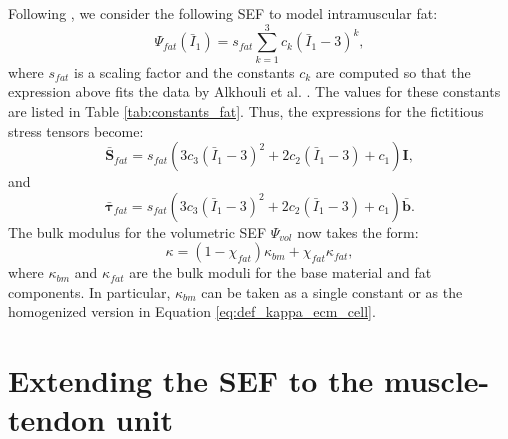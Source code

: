 \documentclass{sfuthesis}
\numberwithin{equation}{section}
\numberwithin{figure}{chapter}
\numberwithin{table}{chapter}
\theoremstyle{definition}
\def\*#1{{\mathbf{#1}}} %
\newcommand{\I}{{\bar{I}}}
\def\btau{{\bm{\tau}}}
\begin{document}
Following \cite{KonnoEtAl2022_CP}, we consider the following SEF to model intramuscular fat:
\begin{equation} \label{eq:def_Psi_fat}
    \Psi_{fat}(\I_1) = s_{fat} \sum_{k=1}^3 c_k (\I_1 - 3)^k,
\end{equation}
where $s_{fat}$ is a scaling factor and the constants $c_k$ are computed so that the expression above fits the data by Alkhouli et al. \cite{Alkhouli2013}. The values for these constants are listed in Table \ref{tab:constants_fat}. Thus, the expressions for the fictitious stress tensors become:
\begin{equation}
    \bar{\*S}_{fat} = s_{fat} \left( 3c_3(\I_1-3)^2 + 2c_2 (\I_1-3) + c_1 \right) \*I, 
\end{equation}
and
\begin{equation}
    \bar{\btau}_{fat} = s_{fat} \left( 3c_3(\I_1-3)^2 + 2c_2 (\I_1-3) + c_1 \right) \bar{\*b}.
\end{equation}
The bulk modulus for the volumetric SEF $\Psi_{vol}$ now takes the form:
\begin{equation} \label{eq:def_kappa_bm_fat}
    \kappa = (1-\chi_{fat}) \kappa_{bm} + \chi_{fat} \kappa_{fat},
\end{equation}
where $\kappa_{bm}$ and $\kappa_{fat}$ are the bulk moduli for the base material and fat components. In particular, $\kappa_{bm}$ can be taken as a single constant or as the homogenized version in Equation \eqref{eq:def_kappa_ecm_cell}.

\section{Extending the SEF to the muscle-tendon unit} \label{sec:extension_sef_mtu}
\end{document}
